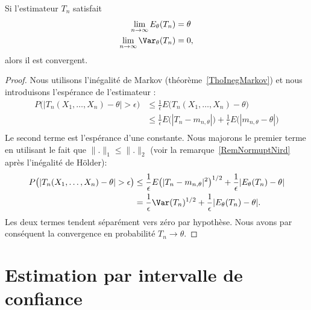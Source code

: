 \begin{lemma}
	Si l'estimateur \( T_n\) satisfait
	\begin{subequations}
		\begin{align}
			\lim_{n\to \infty} E_{\theta}(T_n)    & =\theta \\
			\lim_{n\to \infty} \Var_{\theta}(T_n) & =0,
		\end{align}
	\end{subequations}
	alors il est convergent.
\end{lemma}

\begin{proof}
	Nous utilisons l'inégalité de Markov (théorème~\ref{ThoInegMarkov}) et nous introduisons l'espérance de l'estimateur :
	\begin{subequations}
		\begin{align}
			P\big( | T_n(X_1,\ldots ,X_n)-\theta |>\epsilon \big) & \leq\frac{1}{ \epsilon }E\big( T_n(X_1,\ldots,X_n)-\theta \big)                                                   \\
			                                                      & \leq \frac{1}{ \epsilon }E\big( | T_n-m_{n,\theta} | \big)+\frac{1}{ \epsilon }E\big(| m_{n,\theta}-\theta |\big) \\
		\end{align}
	\end{subequations}
	Le second terme est l'espérance d'une constante. Nous majorons le premier terme en utilisant le fait que \( \| . \|_1\leq\| . \|_2\) (voir la remarque~\ref{RemNormuptNird} après l'inégalité de Hölder):
	\begin{subequations}
		\begin{align}
			P\big( | T_n(X_1,\ldots ,X_n)-\theta |>\epsilon \big) & \leq \frac{1}{ \epsilon }E\big( | T_n-m_{n,\theta} |^2 \big)^{1/2}+\frac{1}{ \epsilon }| E_{\theta}(T_n)-\theta | \\
			                                                      & =\frac{1}{ \epsilon }\Var(T_n)^{1/2}+\frac{1}{ \epsilon }| E_{\theta}(T_n)-\theta |.
		\end{align}
	\end{subequations}
	Les deux termes tendent séparément vers zéro par hypothèse. Nous avons par conséquent la convergence en probabilité \( T_n\to \theta\).
\end{proof}

\section{Estimation par intervalle de confiance}

